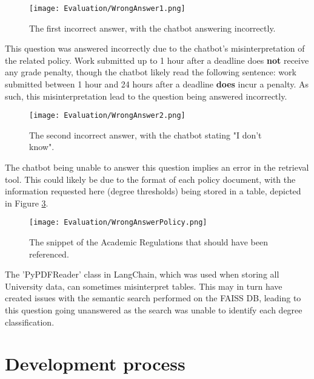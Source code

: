 \begin{figure}[H]
    \centering
    \texttt{[image: Evaluation/WrongAnswer1.png]}
    \caption{The first incorrect answer, with the chatbot answering incorrectly. \label{fig:WrongAnswer1}}
\end{figure}

\noindent This question was answered incorrectly due to the chatbot's misinterpretation of the related policy. Work submitted up to 
1 hour after a deadline does \textbf{not} receive any grade penalty, though the chatbot likely read the following sentence: work submitted between 1 hour and 
24 hours after a deadline \textbf{does} incur a penalty. As such, this misinterpretation lead to the question being answered incorrectly.

\begin{figure}[H]
    \centering
    \texttt{[image: Evaluation/WrongAnswer2.png]}
    \caption{The second incorrect answer, with the chatbot stating "I don't know". \label{fig:WrongAnswer2}}
\end{figure}

\noindent The chatbot being unable to answer this question implies an error in the retrieval tool. This could likely be due to the 
format of each policy document, with the information requested here (degree thresholds) being stored in a table, depicted in Figure 
\ref{fig:WrongAnswer2Snippet}.

\begin{figure}[H]
    \centering
    \texttt{[image: Evaluation/WrongAnswerPolicy.png]}
    \caption{The snippet of the Academic Regulations that should have been referenced. \autocite{bcuPoliciesProcedures} \label{fig:WrongAnswer2Snippet}}
\end{figure}

\noindent The 'PyPDFReader' class in LangChain, which was used when storing all University data, can sometimes misinterpret tables. 
This may in turn have created issues with the semantic search performed on the FAISS DB, leading to this question going unanswered as 
the search was unable to identify each degree classification.



\section{Development process}\label{sec:EvalProcess}

